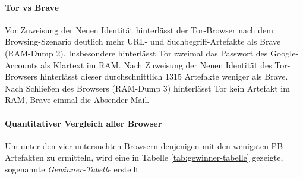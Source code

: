 \paragraph*{Tor vs Brave}
Vor Zuweisung der \glqq{}Neuen Identität\grqq{} hinterlässt der Tor-Browser nach dem Browsing-Szenario  deutlich mehr URL- und Suchbegriff-Artefakte als Brave (RAM-Dump 2). Insbesondere hinterlässt Tor zweimal das Passwort des Google-Accounts als Klartext im RAM.
Nach Zuweisung der \glqq{}Neuen Identität\grqq{} des Tor-Browsers hinterlässt dieser durchschnittlich 1315 Artefakte weniger als Brave.
Nach Schließen des Browsers (RAM-Dump 3) hinterlässt Tor kein Artefakt im RAM, Brave einmal die Absender-Mail. 

\paragraph*{Quantitativer Vergleich aller Browser}
Um unter den vier untersuchten Browsern denjenigen mit den wenigsten PB-Artefakten zu ermitteln, wird eine in Tabelle \ref{tab:gewinner-tabelle} gezeigte, sogenannte  \textit{Gewinner-Tabelle} erstellt \cite{Horsman.2019}.

